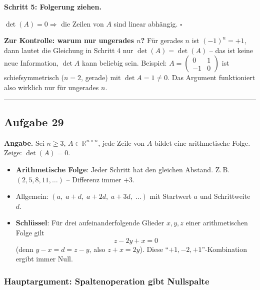 \documentclass[a4paper,12pt]{article}
\begin{document}
\medskip

\textbf{Schritt 5: Folgerung ziehen.}

$\det(A) = 0 \Rightarrow$ die Zeilen von $A$ sind linear abh\"angig. $\square$

\medskip

\textbf{Zur Kontrolle: warum nur ungerades $n$?} F\"ur gerades $n$ ist $(-1)^n = +1$, dann lautet die Gleichung in Schritt 4 nur $\det(A) = \det(A)$ -- das ist keine neue Information, $\det A$ kann beliebig sein. Beispiel: $A = \begin{pmatrix} 0 & 1 \\ -1 & 0 \end{pmatrix}$ ist schiefsymmetrisch ($n=2$, gerade) mit $\det A = 1 \neq 0$. Das Argument funktioniert also wirklich nur f\"ur ungerades $n$.

\bigskip
\hrule
\bigskip

\subsection*{Aufgabe 29}

\textbf{Angabe.} Sei $n \geq 3$, $A \in \mathbb{R}^{n \times n}$, jede Zeile von $A$ bildet eine arithmetische Folge. Zeige: $\det(A) = 0$.

\begin{begriffe}
\begin{itemize}[leftmargin=*, nosep]
    \item \textbf{Arithmetische Folge}: Jeder Schritt hat den gleichen Abstand. Z.\,B.\ $(2, 5, 8, 11, \dots)$ -- Differenz immer $+3$.
    \item Allgemein: $(a,\; a + d,\; a + 2d,\; a + 3d,\; \dots)$ mit Startwert $a$ und Schrittweite $d$.
    \item \textbf{Schl\"ussel}: F\"ur drei aufeinanderfolgende Glieder $x, y, z$ einer arithmetischen Folge gilt
    \[
    z - 2y + x = 0
    \]
    (denn $y - x = d = z - y$, also $z + x = 2y$). Diese ``$+1, -2, +1$''-Kombination ergibt immer Null.
\end{itemize}
\end{begriffe}

\subsubsection*{Hauptargument: Spaltenoperation gibt Nullspalte}
\end{document}
